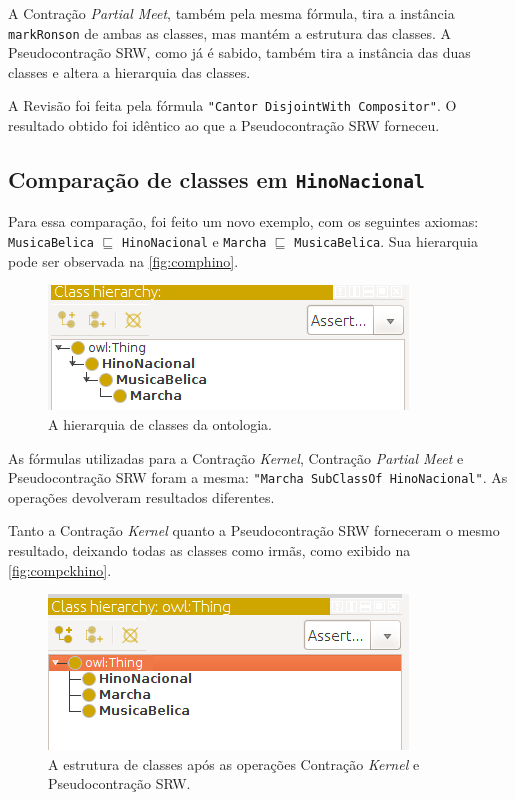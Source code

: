 A Contração \textit{Partial Meet}, também pela mesma fórmula, tira a instância \texttt{markRonson} de ambas as classes, mas mantém a estrutura das classes. A Pseudocontração SRW, como já é sabido, também tira a instância das duas classes e altera a hierarquia das classes.

A Revisão foi feita pela fórmula \texttt{"Cantor DisjointWith Compositor"}. O resultado obtido foi idêntico ao que a Pseudocontração SRW forneceu. 

\subsection{Comparação de classes em \texttt{HinoNacional}}

Para essa comparação, foi feito um novo exemplo, com os seguintes axiomas: \texttt{MusicaBelica} $ \sqsubseteq $ \texttt{HinoNacional} e \texttt{Marcha} $ \sqsubseteq $ \texttt{MusicaBelica}. Sua hierarquia pode ser observada na \autoref{fig:comphino}. 

\begin{figure}[H]
	\centering
	\includegraphics[width=0.5\linewidth]{Capitulos/Testes/comphino}
	\caption{A hierarquia de classes da ontologia.}
	\label{fig:comphino}
\end{figure}

As fórmulas utilizadas para a Contração \textit{Kernel}, Contração \textit{Partial Meet} e Pseudocontração SRW foram a mesma: \texttt{"Marcha SubClassOf HinoNacional"}. As operações devolveram resultados diferentes.

Tanto a Contração \textit{Kernel} quanto a Pseudocontração SRW forneceram o mesmo resultado, deixando todas as classes como irmãs, como exibido na \autoref{fig:compckhino}.

\begin{figure}[H]
	\centering
	\includegraphics[width=0.5\linewidth]{Capitulos/Testes/compckhino}
	\caption{A estrutura de classes após as operações Contração \textit{Kernel} e Pseudocontração SRW.}
	\label{fig:compckhino}
\end{figure}

